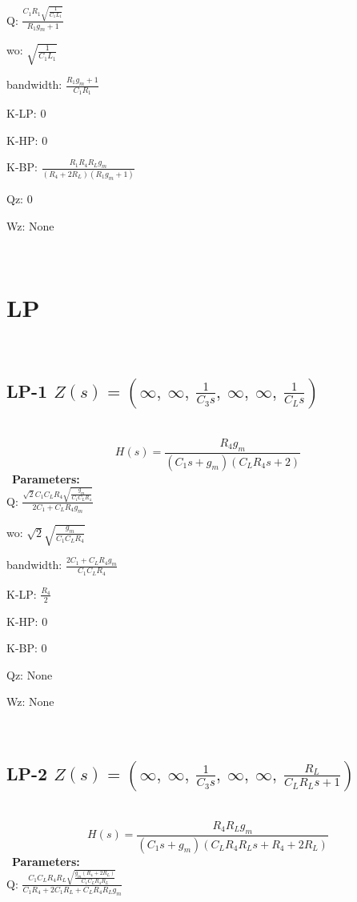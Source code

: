 \documentclass{article}
\begin{document}
Q: $\frac{C_{1} R_{1} \sqrt{\frac{1}{C_{1} L_{1}}}}{R_{1} g_{m} + 1}$\ 

wo: $\sqrt{\frac{1}{C_{1} L_{1}}}$\ 

bandwidth: $\frac{R_{1} g_{m} + 1}{C_{1} R_{1}}$\ 

K-LP: $0$\ 

K-HP: $0$\ 

K-BP: $\frac{R_{1} R_{4} R_{L} g_{m}}{\left(R_{4} + 2 R_{L}\right) \left(R_{1} g_{m} + 1\right)}$\ 

Qz: $0$\ 

Wz: $\text{None}$\ 

\ 

\section{LP}\ 
\subsection{LP-1 $Z(s) = \left( \infty, \  \infty, \  \frac{1}{C_{3} s}, \  \infty, \  \infty, \  \frac{1}{C_{L} s}\right)$ } \ 
\textbf{\[H(s) = \frac{R_{4} g_{m}}{\left(C_{1} s + g_{m}\right) \left(C_{L} R_{4} s + 2\right)}\] } \ 
\textbf{Parameters:}\\ 

Q: $\frac{\sqrt{2} C_{1} C_{L} R_{4} \sqrt{\frac{g_{m}}{C_{1} C_{L} R_{4}}}}{2 C_{1} + C_{L} R_{4} g_{m}}$\ 

wo: $\sqrt{2} \sqrt{\frac{g_{m}}{C_{1} C_{L} R_{4}}}$\ 

bandwidth: $\frac{2 C_{1} + C_{L} R_{4} g_{m}}{C_{1} C_{L} R_{4}}$\ 

K-LP: $\frac{R_{4}}{2}$\ 

K-HP: $0$\ 

K-BP: $0$\ 

Qz: $\text{None}$\ 

Wz: $\text{None}$\ 

\ 

\subsection{LP-2 $Z(s) = \left( \infty, \  \infty, \  \frac{1}{C_{3} s}, \  \infty, \  \infty, \  \frac{R_{L}}{C_{L} R_{L} s + 1}\right)$ } \ 
\textbf{\[H(s) = \frac{R_{4} R_{L} g_{m}}{\left(C_{1} s + g_{m}\right) \left(C_{L} R_{4} R_{L} s + R_{4} + 2 R_{L}\right)}\] } \ 
\textbf{Parameters:}\\ 

Q: $\frac{C_{1} C_{L} R_{4} R_{L} \sqrt{\frac{g_{m} \left(R_{4} + 2 R_{L}\right)}{C_{1} C_{L} R_{4} R_{L}}}}{C_{1} R_{4} + 2 C_{1} R_{L} + C_{L} R_{4} R_{L} g_{m}}$\ 
\end{document}
